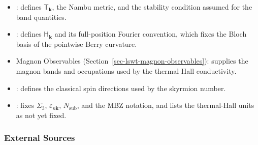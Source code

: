 \begin{itemize}
\tightlist
\item
  : defines \(\mathsf T_{\mathbf k}\), the Nambu metric, and the stability condition assumed for the band quantities.
\item
  : defines \(\mathsf H_{\mathbf k}\) and its full-position Fourier convention, which fixes the Bloch basis of the pointwise Berry curvature.
\item
  Magnon Observables (Section~\ref{sec-lswt-magnon-observables}): supplies the magnon bands and occupations used by the thermal Hall conductivity.
\item
  : defines the classical spin directions used by the skyrmion number.
\item
  : fixes \(\Sigma_3\), \(\varepsilon_{n\mathbf k}\), \(N_{\mathrm{sub}}\), and the MBZ notation, and lists the thermal-Hall units as not yet fixed.
\end{itemize}

\subsubsection{External Sources}

